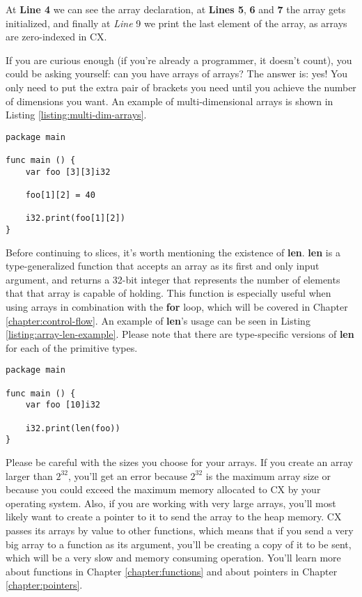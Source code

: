\documentclass[11pt,fleqn,openany]{book} %
\begin{document}
At \textbf{Line 4} we can see the array declaration, at \textbf{Lines 5}, \textbf{6} and \textbf{7} the array gets initialized, and finally at \textit{Line} 9 we print the last element of the array, as arrays are zero-indexed in CX.

If you are curious enough (if you're already a programmer, it doesn't count), you could be asking yourself: can you have arrays of arrays? The answer is: yes! You only need to put the extra pair of brackets you need until you achieve the number of dimensions you want. An example of multi-dimensional arrays is shown in Listing \ref{listing:multi-dim-arrays}.

\begin{lstlisting}[caption={Multi-dimensional Arrays},captionpos=b,label={listing:multi-dim-arrays}]
package main

func main () {
	var foo [3][3]i32
    
    foo[1][2] = 40
    
    i32.print(foo[1][2])
}
\end{lstlisting}

Before continuing to slices, it's worth mentioning the existence of \textbf{len}. \textbf{len} is a type-generalized function that accepts an array as its first and only input argument, and returns a 32-bit integer that represents the number of elements that that array is capable of holding. This function is especially useful when using arrays in combination with the \textbf{for} loop, which will be covered in Chapter \ref{chapter:control-flow}. An example of \textbf{len}'s usage can be seen in Listing \ref{listing:array-len-example}. Please note that there are type-specific versions of \textbf{len} for each of the primitive types.

\begin{lstlisting}[caption={Printing Array Length},captionpos=b,label={listing:array-len-example}]
package main

func main () {
	var foo [10]i32
    
    i32.print(len(foo))
}
\end{lstlisting}

Please be careful with the sizes you choose for your arrays. If you create an array larger than $2^{32}$, you'll get an error because $2^{32}$ is the maximum array size or because you could exceed the maximum memory allocated to CX by your operating system. Also, if you are working with very large arrays, you'll most likely want to create a pointer to it to send the array to the heap memory. CX passes its arrays by value to other functions, which means that if you send a very big array to a function as its argument, you'll be creating a copy of it to be sent, which will be a very slow and memory consuming operation. You'll learn more about functions in Chapter \ref{chapter:functions} and about pointers in Chapter \ref{chapter:pointers}.
\end{document}

